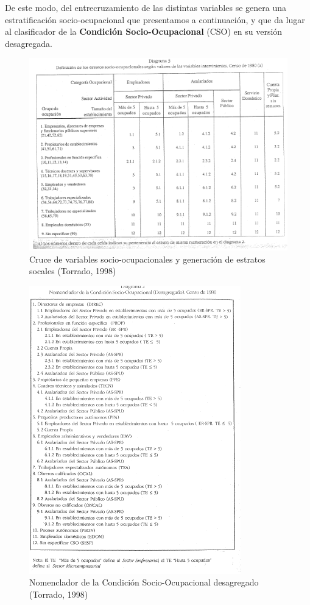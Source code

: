 \documentclass[
]{book}
\begin{document}
De este modo, del entrecruzamiento de las distintas variables se genera una estratificación socio-ocupacional que presentamos a continuación, y que da lugar al clasificador de la \textbf{Condición Socio-Ocupacional} (CSO) en su versión desagregada.

\begin{figure}

{\centering \includegraphics[width=0.8\linewidth]{imagenes/torrado1} 

}

\caption{Cruce de variables socio-ocupacionales y generación de estratos socales (Torrado, 1998)}\label{fig:unnamed-chunk-67}
\end{figure}

\begin{figure}

{\centering \includegraphics[width=0.8\linewidth]{imagenes/torrado2} 

}

\caption{Nomenclador de la Condición Socio-Ocupacional desagregado (Torrado, 1998)}\label{fig:unnamed-chunk-68}
\end{figure}
\end{document}
